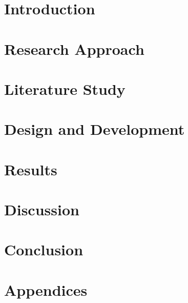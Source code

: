 \documentclass[12pt,a4paper]{book}
\newcommand{\blankpage}[0]{
	\newpage
	\thispagestyle{plain}
	\mbox{}
}
\begin{document}
\hypersetup{pageanchor=false}

\blankpage	
\cleardoublepage
\frontmatter




\tableofcontents
\newpage
\listoftables
\newpage
\listoffigures
\newpage
\hypersetup{pageanchor=true}
\mainmatter
%
%
\part{Introduction}

\part{Research Approach}



\part{Literature Study}



\part{Design and Development}

\part{Results}

\part{Discussion}

\part{Conclusion}



\clearpage
\backmatter
%

\part{Appendices}
\end{document}
